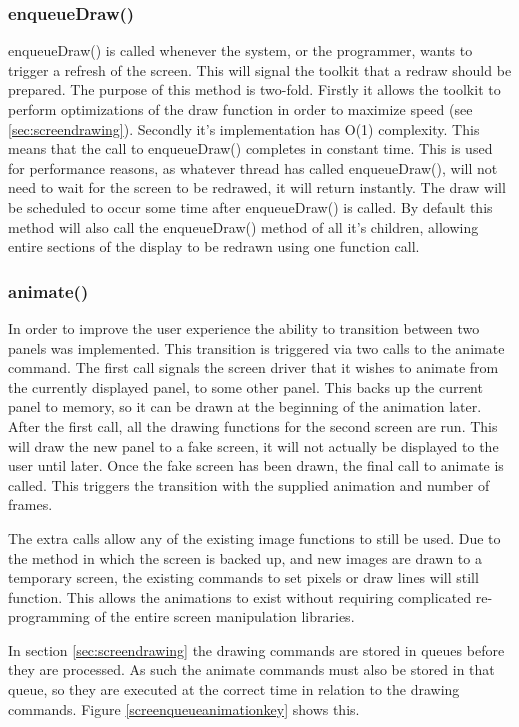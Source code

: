 \subsubsection{enqueueDraw()}

enqueueDraw() is called whenever the system, or the programmer, wants to trigger a refresh of the screen. This will signal the toolkit that a redraw should be prepared. The purpose of this method is two-fold. Firstly it allows the toolkit to perform optimizations of the draw function in order to maximize speed (see \ref{sec:screendrawing}). Secondly it's implementation has O(1) complexity. This means that the call to enqueueDraw() completes in constant time. This is used for performance reasons, as whatever thread has called enqueueDraw(), will not need to wait for the screen to be redrawed, it will return instantly. The draw will be scheduled to occur some time after enqueueDraw() is called. By default this method will also call the enqueueDraw() method of all it's children, allowing entire sections of the display to be redrawn using one function call.

\subsubsection{animate()}

In order to improve the user experience the ability to transition between two panels was implemented. This transition is triggered via two calls to the animate command. The first call signals the screen driver that it wishes to animate from the currently displayed panel, to some other panel. This backs up the current panel to memory, so it can be drawn at the beginning of the animation later. After the first call, all the drawing functions for the second screen are run. This will draw the new panel to a fake screen, it will not actually be displayed to the user until later. Once the fake screen has been drawn, the final call to animate is called. This triggers the transition with the supplied animation and number of frames.

The extra calls allow any of the existing image functions to still be used. Due to the method in which the screen is backed up, and new images are drawn to a temporary screen, the existing commands to set pixels or draw lines will still function. This allows the animations to exist without requiring complicated re-programming of the entire screen manipulation libraries. 

In section \ref{sec:screendrawing} the drawing commands are stored in queues before they are processed. As such  the animate commands must also be stored in that queue, so they are executed at the correct time in relation to the drawing commands. Figure \ref{screenqueueanimationkey} shows this.

